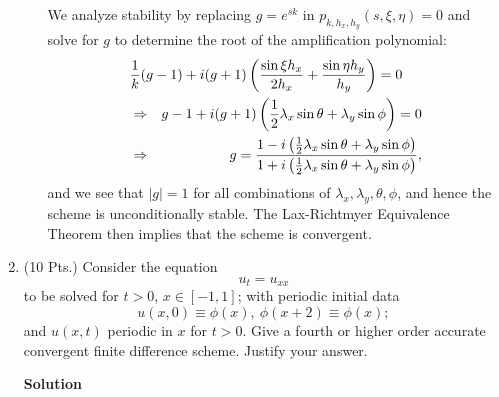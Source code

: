 \documentclass{article}
\begin{document}
\begin{enumerate}
\begin{enumerate}
We analyze stability by replacing \(g = e^{sk}\) in \(p_{k,h_x,h_y}(s,\xi,\eta) = 0\) and solve for \(g\) to determine the root of the amplification polynomial:
\begin{eqnarray*}
\lefteqn{\frac{1}{k} (g - 1) + i (g + 1) \left( \frac{\sin \xi h_x}{2h_x} + \frac{\sin \eta h_y}{h_y} \right) = 0} \\
& \Rightarrow & g - 1 + i (g + 1) \left( \frac{1}{2} \lambda_x \sin \theta + \lambda_y \sin \phi \right) = 0 \\
& \Rightarrow & g = \frac{1 - i \left( \frac{1}{2} \lambda_x \sin \theta + \lambda_y \sin \phi \right)}
                         {1 + i \left( \frac{1}{2} \lambda_x \sin \theta + \lambda_y \sin \phi \right)},
\end{eqnarray*}
and we see that \(|g| = 1\) for all combinations of \(\lambda_x, \lambda_y, \theta, \phi\), and hence the scheme is unconditionally stable.  The Lax-Richtmyer Equivalence Theorem then implies that the scheme is convergent.

\end{enumerate}



\item (10 Pts.) Consider the equation
\[u_t = u_{xx}\]
to be solved for \(t > 0\), \(x \in [-1,1]\); with periodic initial data
\[u(x,0) \equiv \phi(x), \ \phi(x + 2) \equiv \phi(x);\]
and \(u(x,t)\) periodic in \(x\) for \(t > 0\).  Give a fourth or higher order accurate convergent finite difference scheme.  Justify your answer.

{\bf Solution}


\end{enumerate}
\end{document}
